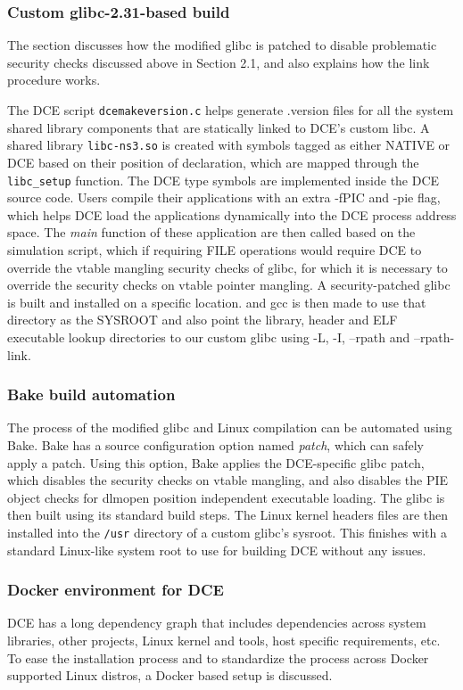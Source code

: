 \documentclass{sig-alternate}
\begin{document}
\subsubsection{Custom glibc-2.31-based build}
The section discusses how the modified glibc is patched to disable problematic security checks discussed above in Section 2.1, and also
explains how the link procedure works.

The DCE script \texttt{dcemakeversion.c} helps generate .version files for all the system shared library components that are statically linked to DCE's custom libc. A 
shared library \texttt{libc-ns3.so} is created with symbols tagged as either NATIVE or DCE based on their position of declaration, which are mapped through the 
\texttt{libc\_setup} function. The DCE type symbols are implemented 
inside the DCE source code. Users compile their applications with an extra -fPIC and -pie flag, which helps DCE load the applications dynamically into the DCE process 
address space. The \emph{main} function of these application are then called based on the simulation script, which if requiring FILE operations would require DCE to override the vtable 
mangling security checks of glibc, 
for which it is necessary to override the security checks on vtable pointer mangling. A security-patched glibc is built and installed on a specific location. and gcc is then made 
to use that directory as the SYSROOT and also point the library, header and ELF executable lookup directories to our custom glibc using -L, -I, --rpath and --rpath-link.

\subsubsection{Bake build automation}
The process of the modified glibc and Linux compilation can be automated using Bake.
Bake has a source configuration option named \textit{patch}, which can safely apply a patch.
Using this option, Bake applies the DCE-specific glibc patch, which disables the security checks on vtable mangling, and also disables the 
PIE object checks for dlmopen position independent executable loading. The glibc is then built using its standard build steps. The Linux kernel headers
files are then installed into the \texttt{/usr} directory of a custom glibc's sysroot. This finishes with a standard Linux-like system root to use for building 
DCE without any issues. 

\subsubsection{Docker environment for DCE}
DCE has a long dependency graph that includes dependencies across 
system libraries, other projects, Linux kernel and tools, host specific requirements, etc. To ease the installation process and to standardize the process 
across Docker supported Linux distros, a Docker based setup is discussed.
\end{document}
